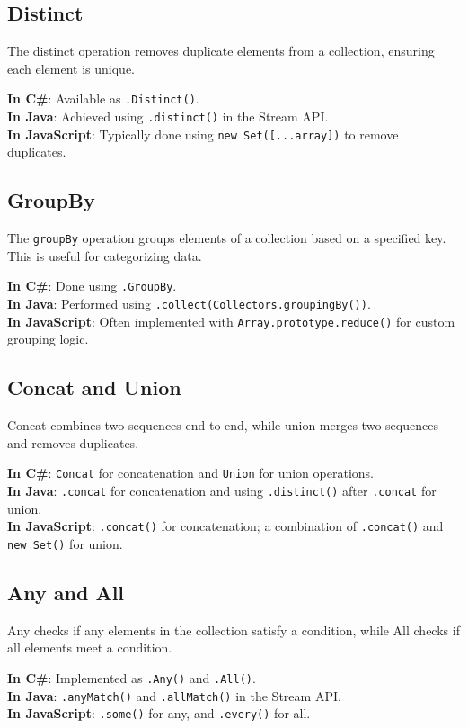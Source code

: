 \subsection*{Distinct}
The distinct operation removes duplicate elements from a collection, ensuring each element is unique.

\textbf{In C\#}: Available as \texttt{.Distinct()}. \\
\textbf{In Java}: Achieved using \texttt{.distinct()} in the Stream API. \\
\textbf{In JavaScript}: Typically done using \texttt{new Set([...array])} to remove duplicates.

\subsection*{GroupBy}
The \texttt{groupBy} operation groups elements of a collection based on a specified key. This is useful for categorizing data.

\textbf{In C\#}: Done using \texttt{.GroupBy}. \\
\textbf{In Java}: Performed using \texttt{.collect(Collectors.groupingBy())}. \\
\textbf{In JavaScript}: Often implemented with \texttt{Array.prototype.reduce()} for custom grouping logic.

\subsection*{Concat and Union}
Concat combines two sequences end-to-end, while union merges two sequences and removes duplicates.

\textbf{In C\#}: \texttt{Concat} for concatenation and \texttt{Union} for union operations. \\
\textbf{In Java}: \texttt{.concat} for concatenation and using \texttt{.distinct()} after \texttt{.concat} for union. \\
\textbf{In JavaScript}: \texttt{.concat()} for concatenation; a combination of \texttt{.concat()} and \texttt{new Set()} for union.

\subsection*{Any and All}
Any checks if any elements in the collection satisfy a condition, while All checks if all elements meet a condition.

\textbf{In C\#}: Implemented as \texttt{.Any()} and \texttt{.All()}. \\
\textbf{In Java}: \texttt{.anyMatch()} and \texttt{.allMatch()} in the Stream API. \\
\textbf{In JavaScript}: \texttt{.some()} for any, and \texttt{.every()} for all.


